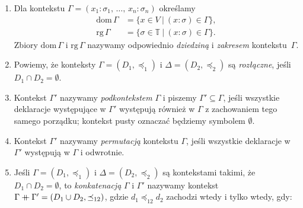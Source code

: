 \begin{definicja}\label{def:context_simple}
  \begin{enumerate}[label=(\arabic*)]
  \setlength\itemsep{0em}
  \item Dla kontekstu \(\Gamma=(x_1:\sigma_1,\,\dots,\,x_n:\sigma_n)\) określamy
    \begin{align*}
       \mathrm{dom}\,\Gamma &= \{x\in V\ |\ (x:\sigma) \in \Gamma \},\\
       \mathrm{rg}\,\Gamma &= \{\sigma\in\mathbb{T}\ |\ (x:\sigma) \in \Gamma \}.
    \end{align*}
      Zbiory \(\mathrm{dom}\,\Gamma\) i \(\mathrm{rg}\,\Gamma\) nazywamy odpowiednio \emph{dziedziną} i \emph{zakresem} kontekstu~\(\Gamma\).
    \item Powiemy, że konteksty \(\Gamma=(D_1, \preceq_1)\) i \(\Delta=(D_2, \preceq_2)\) są \emph{rozłączne}, jeśli \({D_1\cap D_2=\emptyset}\).
    \item Kontekst \(\Gamma'\) nazywamy \emph{podkontekstem} \(\Gamma\) i piszemy \(\Gamma'\subseteq\Gamma\), jeśli wszystkie deklaracje występujące w \(\Gamma'\) występują również w \(\Gamma\) z zachowaniem tego samego porządku; kontekst pusty oznaczać będziemy symbolem \(\emptyset\).
    \item Kontekst \(\Gamma'\) nazywamy \emph{permutacją} kontekstu \(\Gamma\), jeśli wszystkie deklaracje w \(\Gamma'\) występują w \(\Gamma\) i odwrotnie.
    \item Jeśli \(\Gamma=(D_1,\preceq_1)\) i \(\Delta=(D_2, \preceq_2)\) są kontekstami takimi, że \(D_1 \cap D_2=\emptyset\), to \emph{konkatenacją} \(\Gamma\) i \(\Gamma'\) nazywamy kontekst \(\Gamma \mathbin{+\mkern-10mu+} \Gamma' = (D_1\cup D_2, \preceq_{12})\), gdzie \(d_1 \preceq_{12} d_2\) zachodzi wtedy i tylko wtedy, gdy:

\end{enumerate}
\end{definicja}
